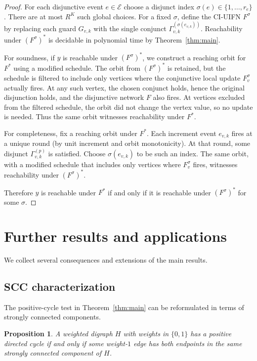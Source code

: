 \documentclass[final,3p,times]{elsarticle}
\newtheorem{proposition}[theorem]{Proposition}
\theoremstyle{definition}
\theoremstyle{remark}
\newcommand{\cE}{\mathcal{E}}
\begin{document}
\begin{proof}
For each disjunctive event $e\in\cE$ choose a disjunct index $\sigma(e)\in\{1,\dots,r_e\}$.
There are at most $R^K$ such global choices.
For a fixed $\sigma$, define the CI-UIFN $F^\sigma$ by replacing each guard $G_{v,k}$ with the single conjunct $\Gamma_{v,k}^{(\sigma(e_{v,k}))}$.
Reachability under $(F^\sigma)^\ast$ is decidable in polynomial time by Theorem~\ref{thm:main}.

For soundness, if $y$ is reachable under $(F^\sigma)^\ast$, we construct a reaching orbit for $F^\ast$ using a modified schedule.
The orbit from $(F^\sigma)^\ast$ is retained, but the schedule is filtered to include only vertices where the conjunctive local update $F^\sigma_v$ actually fires.
At any such vertex, the chosen conjunct holds, hence the original disjunction holds, and the disjunctive network $F$ also fires.
At vertices excluded from the filtered schedule, the orbit did not change the vertex value, so no update is needed.
Thus the same orbit witnesses reachability under $F^\ast$.

For completeness, fix a reaching orbit under $F^\ast$.
Each increment event $e_{v,k}$ fires at a unique round (by unit increment and orbit monotonicity).
At that round, some disjunct $\Gamma_{v,k}^{(p)}$ is satisfied.
Choose $\sigma(e_{v,k})$ to be such an index.
The same orbit, with a modified schedule that includes only vertices where $F^\sigma_v$ fires, witnesses reachability under $(F^\sigma)^\ast$.

Therefore $y$ is reachable under $F^\ast$ if and only if it is reachable under $(F^\sigma)^\ast$ for some $\sigma$.
\end{proof}

\section{Further results and applications}

We collect several consequences and extensions of the main results.

\subsection*{SCC characterization}

The positive-cycle test in Theorem~\ref{thm:main} can be reformulated in terms of strongly connected components.

\begin{proposition}\label{prop:scc}
A weighted digraph $H$ with weights in $\{0,1\}$ has a positive directed cycle if and only if some weight-$1$ edge has both endpoints in the same strongly connected component of $H$.
\end{proposition}
\end{document}
